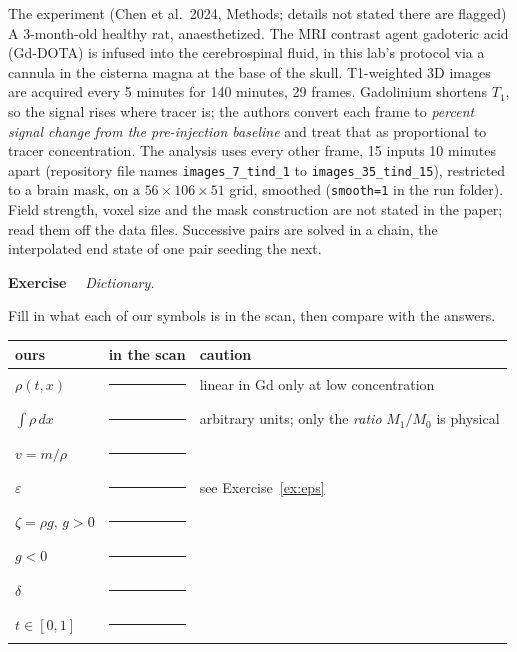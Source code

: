 \documentclass[11pt]{article}
\newcommand{\eps}{\varepsilon}
\newcommand{\code}[1]{\texttt{#1}}
\newcounter{ex}
\newenvironment{ex}[1]{\refstepcounter{ex}\par\medskip\noindent\textbf{Exercise \theex}\ \ \textit{#1}\par\nopagebreak\smallskip}{\par\medskip}
\begin{document}
\begin{physbox}{{The experiment (Chen et al.\ 2024, Methods; details not stated there are flagged)}}
A 3-month-old healthy rat, anaesthetized. The MRI contrast agent gadoteric acid (Gd-DOTA) is
infused into the cerebrospinal fluid, in this lab's protocol via a cannula in the cisterna
magna at the base of the skull. T1-weighted 3D images are acquired every 5 minutes for 140
minutes, 29 frames. Gadolinium shortens $T_1$, so the signal rises where tracer is; the
authors convert each frame to \emph{percent signal change from the pre-injection baseline}
and treat that as proportional to tracer concentration. The analysis uses every other frame,
15 inputs 10 minutes apart (repository file names \code{images\_7\_tind\_1} to
\code{images\_35\_tind\_15}), restricted to a brain mask, on a $56\times106\times51$ grid,
smoothed (\code{smooth=1} in the run folder). Field strength, voxel size and the mask
construction are not stated in the paper; read them off the data files. Successive pairs are
solved in a chain, the interpolated end state of one pair seeding the next.
\end{physbox}

\begin{ex}{Dictionary.}
Fill in what each of our symbols is in the scan, then compare with the answers.
\begin{center}\small
\begin{tabular}{@{}lll@{}}
\toprule
ours & in the scan & caution \\
\midrule
$\rho(t,x)$ & \rule{3.2cm}{0.3pt} & linear in Gd only at low concentration \\
$\int\rho\,dx$ & \rule{3.2cm}{0.3pt} & arbitrary units; only the \emph{ratio} $M_1/M_0$ is physical \\
$v=m/\rho$ & \rule{3.2cm}{0.3pt} & \\
$\eps$ & \rule{3.2cm}{0.3pt} & see Exercise~\ref{ex:eps} \\
$\zeta=\rho g$, $g>0$ & \rule{3.2cm}{0.3pt} & \\
$g<0$ & \rule{3.2cm}{0.3pt} & \\
$\delta$ & \rule{3.2cm}{0.3pt} & \\
$t\in[0,1]$ & \rule{3.2cm}{0.3pt} & \\
\bottomrule
\end{tabular}
\end{center}
\end{ex}
\end{document}
